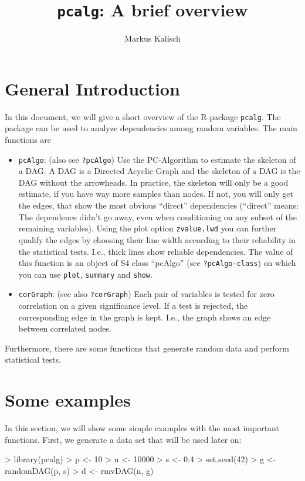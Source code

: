 \documentclass[a4paper]{article}
\title{\texttt{pcalg}: A brief overview}
\author{Markus Kalisch}
\begin{document}
\maketitle
\section{General Introduction}
In this document, we will give a short overview of the R-package
\texttt{pcalg}. The package can be used to analyze dependencies among
random variables. The main functions are
\begin{itemize}
\item \texttt{pcAlgo}: (also see \texttt{?pcAlgo}) Use the PC-Algorithm to
  estimate the skeleton of a 
  DAG. A DAG is a Directed Acyclic Graph and the skeleton of a DAG is the
  DAG without the arrowheads. In practice, the skeleton will only be a good
  estimate, if you have 
  way more samples than nodes. If not, you will only get the edges, that
  show the most obvious ``direct'' dependencies (``direct'' means: The
  dependence didn't go away, even when conditioning on any subset of the
  remaining variables). Using the plot option \texttt{zvalue.lwd} you can
  further qualify the edges by choosing their line width according to their
  reliability in the statistical tests. I.e., thick lines show reliable
  dependencies. The value of this function is an object of S4 class
  ``pcAlgo'' (see \texttt{?pcAlgo-class}) on which you can use
  \texttt{plot}, \texttt{summary} and \texttt{show}.
\item \texttt{corGraph}: (see also \texttt{?corGraph}) Each pair of
  variables is tested for zero 
  correlation on a given significance level. If a test is rejected, the
  corresponding edge in the graph is kept. I.e., the graph shows an edge
  between correlated nodes.
\end{itemize}
Furthermore, there are some functions that generate random data and perform
statistical tests.

\section{Some examples}
In this section, we will show some simple examples with the most important
functions.
First, we generate a data set that will be used later on:
\begin{Schunk}
\begin{Sinput}
> library(pcalg)
> p <- 10
> n <- 10000
> s <- 0.4
> set.seed(42)
> g <- randomDAG(p, s)
> d <- rmvDAG(n, g)
\end{Sinput}
\end{Schunk}
\end{document}
